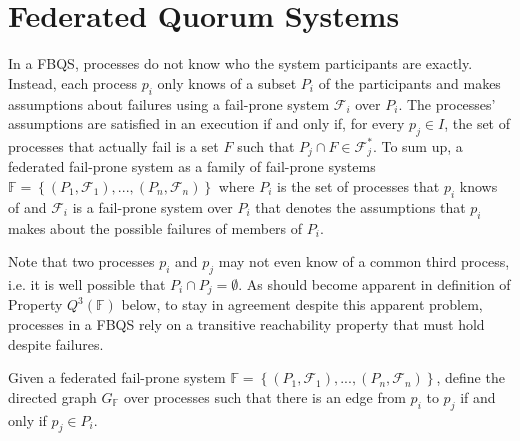 \documentclass[11pt]{article}
\begin{document}


\section{Federated Quorum Systems}

In a FBQS, processes do not know who the system participants are exactly. Instead, each process $p_i$ only knows of a subset $P_i$ of the participants and makes assumptions about failures using a fail-prone system $\mathcal{F}_i$ over $P_i$. The processes' assumptions are satisfied in an execution if and only if, for every $p_j\in I$, the set of processes that actually fail is a set $F$ such that $P_j\cap F \in\mathcal{F}_j^*$. To sum up, a federated fail-prone system as a family of fail-prone systems $\mathbb{F}=\left\{\left(P_1,\mathcal{F}_1\right),...,\left(P_n,\mathcal{F}_n\right)\right\}$ where $P_i$ is the set of processes that $p_i$ knows of and $\mathcal{F}_i$ is a fail-prone system over $P_i$ that denotes the assumptions that $p_i$ makes about the possible failures of members of $P_i$.

Note that two processes $p_i$ and $p_j$ may not even know of a common third process, i.e. it is well possible that $P_i\cap P_j=\emptyset$. As should become apparent in definition of Property $Q^3(\mathbb{F})$ below, to stay in agreement despite this apparent problem, processes in a FBQS rely on a transitive reachability property that must hold despite failures.

Given a federated fail-prone system $\mathbb{F}=\left\{\left(P_1,\mathcal{F}_1\right),...,\left(P_n,\mathcal{F}_n\right)\right\}$, define the directed graph $G_\mathbb{F}$ over processes such that there is an edge from $p_i$ to $p_j$ if and only if $p_j\in P_i$.%
\end{document}
